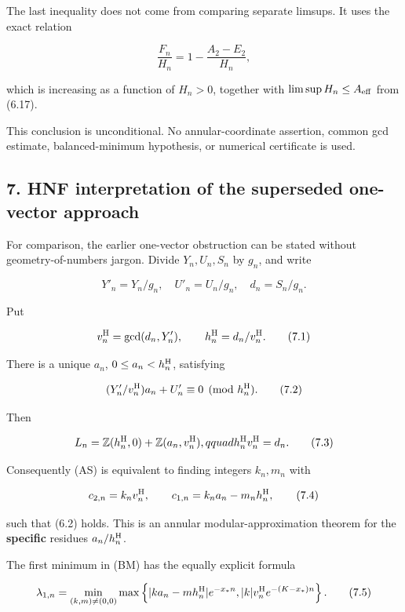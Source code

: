 \documentclass[
  11pt,
]{article}
\begin{document}
The last inequality does not come from comparing separate limsups. It
uses the exact relation

\[
 \frac{F_n}{H_n}=1-\frac{A_2-E_2}{H_n},
\]

which is increasing as a function of \(H_n>0\), together with
\(\limsup H_n\le A_{\rm eff}\) from (6.17).

This conclusion is unconditional. No annular-coordinate assertion,
common gcd estimate, balanced-minimum hypothesis, or numerical
certificate is used.

\hypertarget{hnf-interpretation-of-the-superseded-one-vector-approach}{%
\subsection{7. HNF interpretation of the superseded one-vector
approach}\label{hnf-interpretation-of-the-superseded-one-vector-approach}}

For comparison, the earlier one-vector obstruction can be stated without
geometry-of-numbers jargon. Divide \(Y_n,U_n,S_n\) by \(g_n\), and write

\[
 Y'_n=Y_n/g_n,\quad U'_n=U_n/g_n,\quad d_n=S_n/g_n.
\]

Put

\[
 v_n^{\rm H}=\gcd(d_n,Y'_n),\qquad
 h_n^{\rm H}=d_n/v_n^{\rm H}.
 \tag{7.1}
\]

There is a unique \(a_n\), \(0\le a_n<h_n^{\rm H}\), satisfying

\[
 (Y'_n/v_n^{\rm H})a_n+U'_n\equiv0
       \pmod {h_n^{\rm H}}.
 \tag{7.2}
\]

Then

\[
 L_n=\mathbb Z(h_n^{\rm H},0)+
     \mathbb Z(a_n,v_n^{\rm H}),qquad
 h_n^{\rm H}v_n^{\rm H}=d_n.                       \tag{7.3}
\]

Consequently (AS) is equivalent to finding integers \(k_n,m_n\) with

\[
 c_{2,n}=k_nv_n^{\rm H},\qquad
 c_{1,n}=k_na_n-m_nh_n^{\rm H},                    \tag{7.4}
\]

such that (6.2) holds. This is an annular modular-approximation theorem
for the \textbf{specific} residues \(a_n/h_n^{\rm H}\).

The first minimum in (BM) has the equally explicit formula

\[
 \lambda_{1,n}=\min_{(k,m)\ne(0,0)}
 \max\left\{
   |ka_n-mh_n^{\rm H}|e^{-x_*n},
   |k|v_n^{\rm H}e^{-(K-x_*)n}
 \right\}.                                           \tag{7.5}
\]
\end{document}

